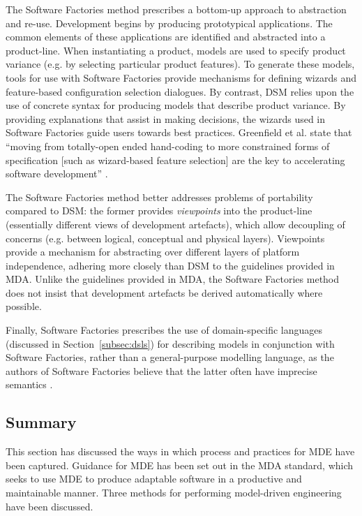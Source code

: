 The Software Factories method \cite{greenfield04software} prescribes a bottom-up approach to abstraction and re-use. Development begins by producing prototypical applications. The common elements of these applications are identified and abstracted into a product-line. When instantiating a product, models are used to specify product variance (e.g. by selecting particular product features). To generate these models, tools for use with Software Factories provide mechanisms for defining wizards and feature-based configuration selection dialogues. By contrast, DSM relies upon the use of concrete syntax for producing models that describe product variance. By providing explanations that assist in making decisions, the wizards used in Software Factories guide users towards best practices. Greenfield et al. state that ``moving from totally-open ended hand-coding to more constrained forms of specification [such as wizard-based feature selection] are the key to accelerating software development'' \cite[pg179]{greenfield04software}.

The Software Factories method better addresses problems of portability compared to DSM: the former provides \textit{viewpoints} into the product-line (essentially different views of development artefacts), which allow decoupling of concerns (e.g. between logical, conceptual and physical layers). Viewpoints provide a mechanism for abstracting over different layers of platform independence, adhering more closely than DSM to the guidelines provided in MDA. Unlike the guidelines provided in MDA, the Software Factories method does not insist that development artefacts be derived automatically where possible.

Finally, Software Factories prescribes the use of domain-specific languages (discussed in Section~\ref{subsec:dsls}) for describing models in conjunction with Software Factories, rather than a general-purpose modelling language, as the authors of Software Factories believe that the latter often have imprecise semantics \cite{greenfield04software}.

\subsection{Summary}
This section has discussed the ways in which process and practices for MDE have been captured. Guidance for MDE has been set out in the MDA standard, which seeks to use MDE to produce adaptable software in a productive and maintainable manner. Three methods for performing model-driven engineering have been discussed.
 
